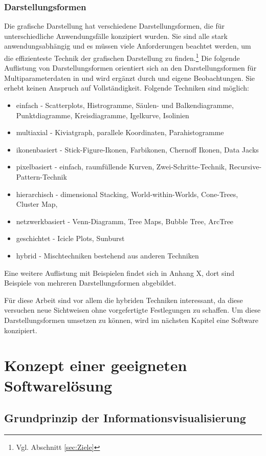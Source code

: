\documentclass[a4paper, 12pt, DIVcalc, onepage, pdftex, headsepline, footsepline]{scrreprt}
\begin{document}
\subsection{Darstellungsformen}
\label{sec:Darstellungsformen}
Die grafische Darstellung hat verschiedene Darstellungsformen, die für unterschiedliche
Anwendungsfälle konzipiert wurden. Sie sind alle stark anwendungsabhängig und es müssen viele
Anforderungen beachtet werden, um die effizienteste Technik der grafischen Darstellung zu
finden.\footnote{Vgl. Abschnitt \ref{sec:Ziele}}
Die folgende Auflistung von Darstellungsformen orientiert sich an den Darstellungsformen für
Multiparameterdaten in \citep[S.\,213]{Schumann} und
wird ergänzt durch \citep{Preim} und eigene Beobachtungen. Sie erhebt keinen Anspruch auf
Vollständigkeit. Folgende Techniken sind möglich:
\begin{itemize}
\item einfach - Scatterplots, Histrogramme, Säulen- und Balkendiagramme, Punktdiagramme, Kreisdiagramme, Igelkurve, Isolinien
\item multiaxial - Kiviatgraph, parallele Koordinaten, Parahistogramme
\item ikonenbasiert - Stick-Figure-Ikonen, Farbikonen, Chernoff Ikonen, Data Jacks
\item pixelbasiert - einfach, raumfüllende Kurven, Zwei-Schritte-Technik, Recursive-Pattern-Technik
\item hierarchisch - dimensional Stacking, World-within-Worlds, Cone-Trees, Cluster Map, 
\item netzwerkbasiert - Venn-Diagramm, Tree Maps, Bubble Tree, ArcTree
\item geschichtet - Icicle Plots, Sunburst
\item hybrid - Mischtechniken bestehend aus anderen Techniken
\end{itemize}
Eine weitere Auflistung mit Beispielen findet sich in Anhang X, dort sind Beispiele
von mehreren Darstellungsformen abgebildet.

Für diese Arbeit sind vor allem die hybriden Techniken interessant, da diese versuchen
neue Sichtweisen ohne vorgefertigte Festlegungen zu schaffen. Um diese Darstellungsformen
umsetzen zu können, wird im nächsten Kapitel eine Software konzipiert.

\chapter{Konzept einer geeigneten Softwarelösung}
\label{cha:Software}
\section{Grundprinzip der Informationsvisualisierung}
\label{sec:Grundprinzip}
\end{document}
